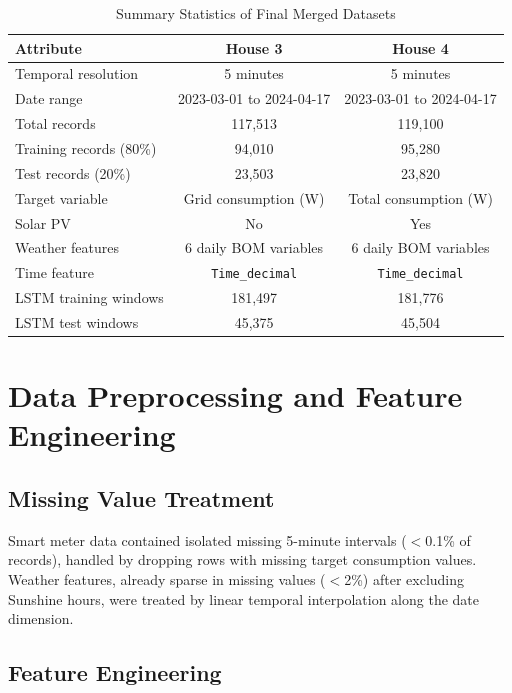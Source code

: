 \documentclass[12pt,a4paper]{article}
\begin{document}
\begin{table}[h]
\centering
\caption{Summary Statistics of Final Merged Datasets}
\label{tab:dataset}
\begin{tabular}{lcc}
\toprule
Attribute & House 3 & House 4 \\
\midrule
Temporal resolution & 5 minutes & 5 minutes \\
Date range & 2023-03-01 to 2024-04-17 & 2023-03-01 to 2024-04-17 \\
Total records & 117,513 & 119,100 \\
Training records (80\%) & 94,010 & 95,280 \\
Test records (20\%) & 23,503 & 23,820 \\
Target variable & Grid consumption (W) & Total consumption (W) \\
Solar PV & No & Yes \\
Weather features & 6 daily BOM variables & 6 daily BOM variables \\
Time feature & \texttt{Time\_decimal} & \texttt{Time\_decimal} \\
LSTM training windows & 181,497 & 181,776 \\
LSTM test windows & 45,375 & 45,504 \\
\bottomrule
\end{tabular}
\end{table}

\section{Data Preprocessing and Feature Engineering}
\label{sec:preprocessing}

\subsection{Missing Value Treatment}

Smart meter data contained isolated missing 5-minute intervals ($<$0.1\% of
records), handled by dropping rows with missing target consumption values.
Weather features, already sparse in missing values ($<$2\%) after excluding
Sunshine hours, were treated by linear temporal interpolation along the date
dimension.

\subsection{Feature Engineering}
\end{document}
